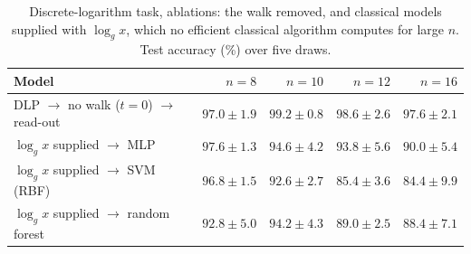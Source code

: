 \begin{table}[htbp]
\centering
\caption[Discrete-logarithm task: ablations]{Discrete-logarithm task, ablations: the walk removed, and classical models supplied with $\log_g x$, which no efficient classical algorithm computes for large $n$. Test accuracy (\%) over five draws.}
\label{tab:latablation}
\begin{tabular}{lrrrr}
\hline
Model & $n=8$ & $n=10$ & $n=12$ & $n=16$ \\
\hline
DLP $\to$ no walk ($t=0$) $\to$ read-out & $97.0 \pm 1.9$ & $99.2 \pm 0.8$ & $98.6 \pm 2.6$ & $97.6 \pm 2.1$ \\
$\log_g x$ supplied $\to$ MLP & $97.6 \pm 1.3$ & $94.6 \pm 4.2$ & $93.8 \pm 5.6$ & $90.0 \pm 5.4$ \\
$\log_g x$ supplied $\to$ SVM (RBF) & $96.8 \pm 1.5$ & $92.6 \pm 2.7$ & $85.4 \pm 3.6$ & $84.4 \pm 9.9$ \\
$\log_g x$ supplied $\to$ random forest & $92.8 \pm 5.0$ & $94.2 \pm 4.3$ & $89.0 \pm 2.5$ & $88.4 \pm 7.1$ \\
\hline
\end{tabular}
\end{table}
